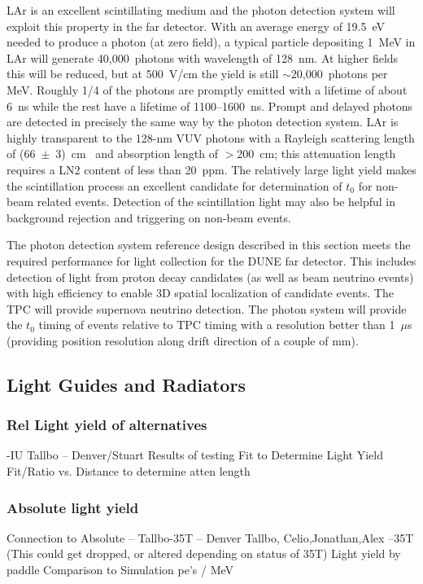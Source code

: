 LAr is an excellent scintillating medium and the photon detection
system will exploit this property in the far detector.  With an
average energy of 19.5~eV needed to produce a photon (at zero field),
a typical particle depositing 1~MeV in LAr will generate
40,000~photons with wavelength of 128~nm. At higher fields this will
be reduced, but at 500~V/cm the yield is still $\sim$20,000~photons
per MeV. Roughly 1/4 of the photons are promptly emitted with a
lifetime of about 6~ns while the rest have a lifetime of
1100--1600~ns. Prompt and delayed photons are detected in
  precisely the same way by the photon detection system. LAr is
highly transparent to the 128-nm VUV photons with a Rayleigh
scattering length of (66~$\pm$~3)~cm~\cite{Rayleigh} and absorption
length of $>$200~cm; this attenuation length requires a LN2
  content of less than 20~ppm. The relatively large light yield makes
the scintillation process an excellent candidate for determination of
$t_0$ for non-beam related events. Detection of the scintillation
light may also be helpful in background rejection and triggering on
non-beam events.

The photon detection system reference design described in this section
meets the required performance for light collection for the DUNE far
detector. This includes detection of light from proton decay
candidates (as well as beam neutrino events) with high efficiency to
enable 3D spatial localization of candidate events. The TPC will
provide supernova neutrino detection. 
The photon system will provide the $t_0$ timing of
events relative to TPC timing with a resolution better than 1~$\mu$s
(providing position resolution along drift direction of a couple of mm). 


\subsection{Light Guides and Radiators}

\subsubsection{Rel Light yield of alternatives}
      -IU Tallbo -- Denver/Stuart
     Results of testing
     Fit to Determine Light Yield
     Fit/Ratio vs. Distance to determine atten length     

\subsubsection{Absolute light yield}
     Connection to Absolute -- Tallbo-35T  -- Denver Tallbo, Celio,Jonathan,Alex --35T
     (This could get dropped, or altered depending on status of 35T)
     Light yield by paddle
     Comparison to Simulation
     pe's / MeV 

